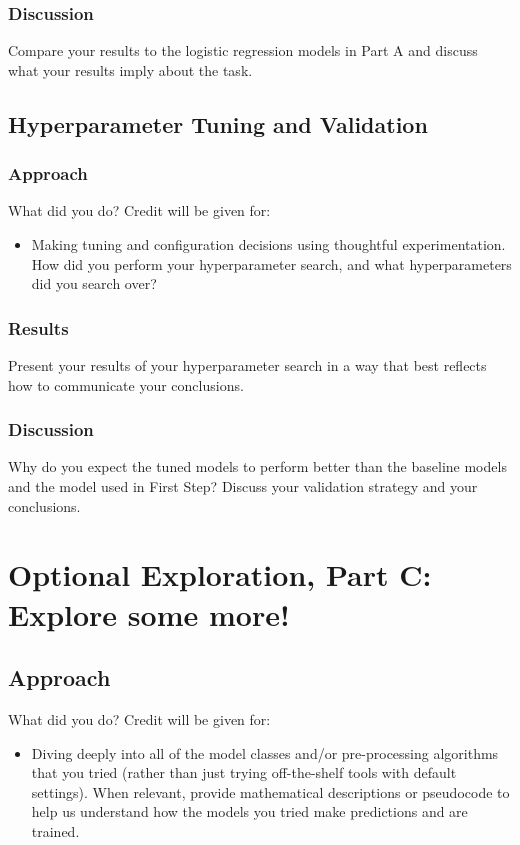 \documentclass[11pt]{article}
\begin{document}
\subsubsection{Discussion}
Compare your results to the logistic regression models in Part A and discuss what your results imply about the task.


\subsection{Hyperparameter Tuning and Validation}

\subsubsection{Approach}
What did you do? Credit will be given for:

  \begin{itemize}
  \item Making tuning and configuration decisions using thoughtful experimentation.  
    How did you perform your hyperparameter search, and what hyperparameters did you search over?
  \end{itemize}

\subsubsection{Results}
Present your results of your hyperparameter search in a way that best reflects how to communicate your conclusions.

\subsubsection{Discussion}

Why do you expect the tuned models to perform better than the baseline models and the model used in First Step? Discuss your validation strategy and your conclusions.

\section{Optional Exploration, Part C: Explore some more!}
\subsection{Approach}

What did you do? Credit will be given for:
  \begin{itemize}
  \item Diving deeply into all of the model classes and/or pre-processing algorithms that you tried (rather than just trying off-the-shelf tools with default settings).  When relevant, provide mathematical descriptions or pseudocode to help us understand how the models you tried make predictions and are trained. 
  \end{itemize}
  
\end{document}
